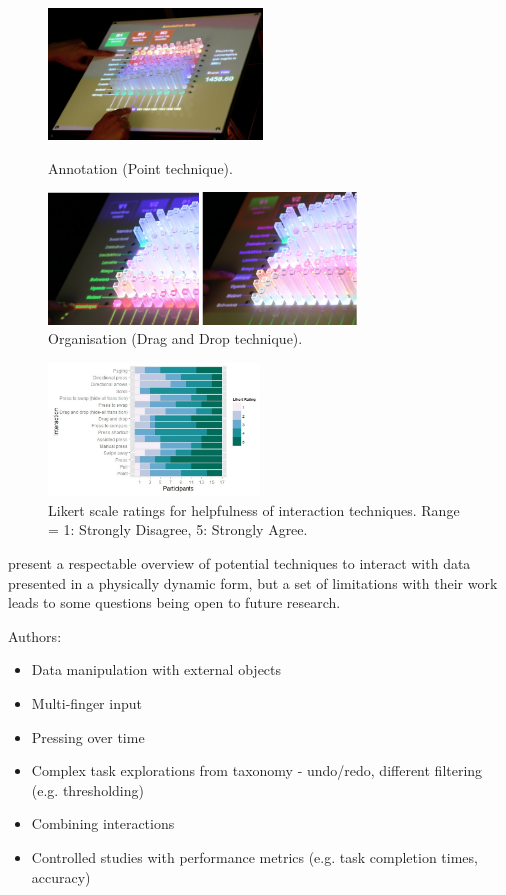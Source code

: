 \documentclass[11pt]{article}
\begin{document}
\begin{figure}[H]
\centering
  \includegraphics[height=3.5cm]{img/taher2015-annotation.png}
  \caption{Annotation (Point technique).}\label{fig:taher2015-annotation}
\endminipage\hfill
{}%
\centering
  \includegraphics[height=3.5cm]{img/taher2015-organize.png}
  \caption{Organisation (Drag and Drop technique).}\label{fig:taher2015-organize}
\endminipage
\end{figure}

\begin{figure}[H]
\centering
\includegraphics[width=0.5\textwidth]{img/taher2015-likert.png} 
\caption{Likert scale ratings for helpfulness of interaction
techniques. Range = 1: Strongly Disagree, 5: Strongly Agree.}\label{fig:taher2015-likert}
\end{figure}

\citet{taher2015} present a respectable overview of potential techniques to interact with data presented in a physically dynamic form, but a set of limitations with their work leads to some questions being open to future research. 

Authors:
\begin{itemize}
\item Data manipulation with external objects
\item Multi-finger input
\item Pressing over time
\item Complex task explorations from taxonomy - undo/redo, different filtering (e.g. thresholding)
\item Combining interactions
\item Controlled studies with performance metrics (e.g. task completion times, accuracy)
\end{itemize}
\end{document}
